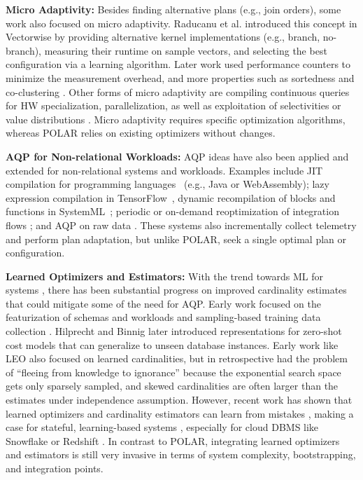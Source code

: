\textbf{Micro Adaptivity:} Besides finding alternative plans (e.g., join orders), some work also focused on micro adaptivity. Raducanu et al. introduced this concept in Vectorwise \cite{RaducanuBZ13} by providing alternative kernel implementations (e.g., branch, no-branch), measuring their runtime on sample vectors, and selecting the best configuration via a learning algorithm. Later work used performance counters to minimize the measurement overhead, and more properties such as sortedness and co-clustering \cite{ZeuchPF16}. Other forms of micro adaptivity are compiling continuous queries for HW specialization, parallelization, as well as exploitation of selectivities or value distributions \cite{GrulichBZTBCRM20,RosenfeldBM23}. Micro adaptivity requires specific optimization algorithms, whereas POLAR relies on existing optimizers without changes. 

\textbf{AQP for Non-relational Workloads:} AQP ideas have also been applied and extended for non-relational systems and workloads. Examples include JIT compilation for programming languages~\cite{HolzleU94} (e.g., Java or WebAssembly); lazy expression compilation in TensorFlow~\cite{MoldovanDWJLNSR19}, dynamic recompilation of blocks and functions in SystemML~\cite{BoehmBERRSTT14}; periodic or on-demand reoptimization of integration flows \cite{Boehm2011}; and AQP on raw data \cite{KarpathiotakisBAA14}. These systems also incrementally collect telemetry and perform plan adaptation, but unlike POLAR, seek a single optimal plan or configuration. 

\textbf{Learned Optimizers and Estimators:} With the trend towards ML for systems \cite{KraskaBCDP18}, there has been substantial progress on improved cardinality estimates that could mitigate some of the need for AQP. Early work focused on the featurization of schemas and workloads and sampling-based training data collection \cite{KipfKRLBK19,DuttWNKNC19,YangLKWDCAHKS19}. Hilprecht and Binnig later introduced representations for zero-shot cost models \cite{HilprechtB22,HilprechtB22b} that can generalize to unseen database instances. Early work like LEO \cite{StillgerLMK01} also focused on learned cardinalities, but in retrospective had the problem of \enquote{fleeing from knowledge to ignorance} \cite{Lohman17} because the exponential search space gets only sparsely sampled,  and skewed cardinalities are often larger than the estimates under independence assumption. However, recent work has shown that learned optimizers and cardinality estimators can learn from mistakes \cite{MarcusNMZAKPT19,MarcusNMTAK21}, making a case for stateful, learning-based systems \cite{abs-2303-15308}, especially for cloud DBMS like Snowflake \cite{DagevilleCZAABC16} or Redshift \cite{GuptaATKPSS15}. In contrast to POLAR, integrating learned optimizers and estimators is still very invasive in terms of system complexity, bootstrapping, and integration points.
